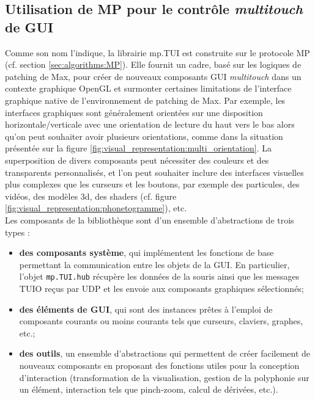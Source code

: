\subsection{Utilisation de MP pour le contrôle \textit{multitouch} de GUI}

\noindent Comme son nom l'indique, la librairie mp.TUI est construite sur le protocole MP (cf. section \ref{sec:algorithms:MP}). Elle fournit un cadre, basé sur les logiques de patching de Max, pour créer de nouveaux composants \gls{GUI} \textit{multitouch} dans un contexte graphique OpenGL et surmonter certaines limitations de l'interface graphique native de l'environnement de patching de Max. Par exemple, les interfaces graphiques sont généralement orientées sur une disposition horizontale/verticale avec une orientation de lecture du haut vers le bas alors qu'on peut souhaiter avoir plusieurs orientations, comme dans la situation présentée sur la figure \ref{fig:visual_representation:multi_orientation}. La superposition de divers composants peut nécessiter des couleurs et des transparents personnalisés, et l'on peut souhaiter inclure des interfaces visuelles plus complexes que les curseurs et les boutons, par exemple des particules, des vidéos, des modèles 3d, des shaders (cf. figure \ref{fig:visual_representation:phonetogramme}), etc.\\
\noindent Les composants de la bibliothèque sont d'un ensemble d'abstractions de trois types :
\vspace{-1em}
\begin{itemize}[noitemsep]
	\item \textbf{des composants système}, qui implémentent les fonctions de base permettant la communication entre les objets de la \gls{GUI}. En particulier, l'objet \verb|mp.TUI.hub| récupère les données de la souris ainsi que les messages \gls{TUIO} reçus par \gls{UDP} et les envoie aux composants graphiques sélectionnés;
	\item \textbf{des éléments de GUI}, qui sont des instances prêtes à l'emploi de composants courants ou moins courants tels que curseurs, claviers, graphes, etc.;
	\item \textbf{des outils}, un ensemble d'abstractions qui permettent de créer facilement de nouveaux composants en proposant des fonctions utiles pour la conception d'interaction (transformation de la visualisation, gestion de la polyphonie sur un élément, interaction tels que pinch-zoom, calcul de dérivées, etc.).
\end{itemize}

